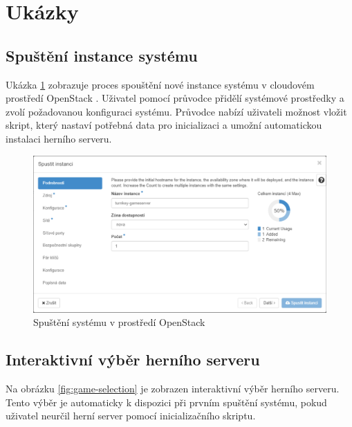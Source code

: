 \section{Ukázky}

\subsection{Spuštění instance systému}

Ukázka \ref{fig:openstack} zobrazuje proces spouštění nové instance systému v cloudovém prostředí OpenStack \cite{openstack}.
Uživatel pomocí průvodce přidělí systémové prostředky a zvolí požadovanou konfiguraci systému.
Průvodce nabízí uživateli možnost vložit skript, který nastaví potřebná data pro inicializaci a umožní automatickou instalaci herního serveru. 

\begin{figure}[h]
    \centering
    \includegraphics[width=1\linewidth]{chapters/images/openstack.pdf}
    \caption{Spuštění systému v prostředí OpenStack \cite{openstack}}
    \label{fig:openstack}
\end{figure}

\subsection{Interaktivní výběr herního serveru}

Na obrázku \ref{fig:game-selection} je zobrazen interaktivní výběr herního serveru. Tento výběr je automaticky
k dispozici při prvním spuštění systému, pokud uživatel neurčil herní server pomocí inicializačního skriptu.


